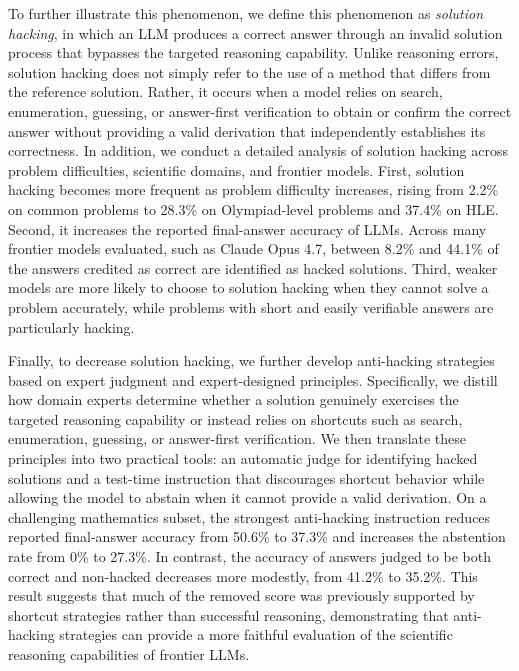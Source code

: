To further illustrate this phenomenon, we define this phenomenon as \emph{solution hacking}, in which an LLM produces a correct answer through an invalid solution process that bypasses the targeted reasoning capability. Unlike reasoning errors, solution hacking does not simply refer to the use of a method that differs from the reference solution. Rather, it occurs when a model relies on search, enumeration, guessing, or answer-first verification to obtain or confirm the correct answer without providing a valid derivation that independently establishes its correctness. In addition, we conduct a detailed analysis of solution hacking across problem difficulties, scientific domains, and frontier models. First, solution hacking becomes more frequent as problem difficulty increases, rising from 2.2\% on common problems to 28.3\% on Olympiad-level problems and 37.4\% on HLE. Second, it increases the reported final-answer accuracy of LLMs. Across many frontier models evaluated, such as Claude Opus 4.7, between 8.2\% and 44.1\% of the answers credited as correct are identified as hacked solutions. Third, weaker models are more likely to choose to solution hacking when they cannot solve a problem accurately, while problems with short and easily verifiable answers are particularly hacking.

Finally, to decrease solution hacking, we further develop anti-hacking strategies based on expert judgment and expert-designed principles. Specifically, we distill how domain experts determine whether a solution genuinely exercises the targeted reasoning capability or instead relies on shortcuts such as search, enumeration, guessing, or answer-first verification. We then translate these principles into two practical tools: an automatic judge for identifying hacked solutions and a test-time instruction that discourages shortcut behavior while allowing the model to abstain when it cannot provide a valid derivation. On a challenging mathematics subset, the strongest anti-hacking instruction reduces reported final-answer accuracy from 50.6\% to 37.3\% and increases the abstention rate from 0\% to 27.3\%. In contrast, the accuracy of answers judged to be both correct and non-hacked decreases more modestly, from 41.2\% to 35.2\%. This result suggests that much of the removed score was previously supported by shortcut strategies rather than successful reasoning, demonstrating that anti-hacking strategies can provide a more faithful evaluation of the scientific reasoning capabilities of frontier LLMs.

